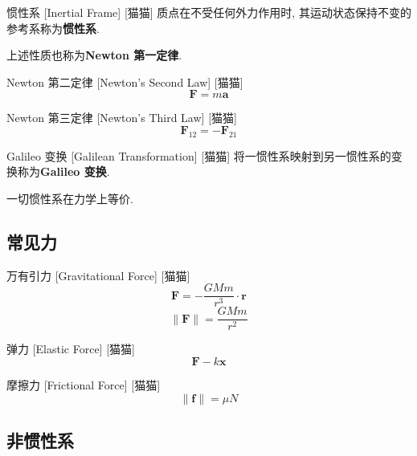 \documentclass[UTF8]{ctexart}
\begin{document}
        \begin{dfn}
            []
            {惯性系}
            [Inertial Frame]
            [猫猫]
            质点在不受任何外力作用时, 其运动状态保持不变的参考系称为\textbf{惯性系}. 

            上述性质也称为\textbf{Newton 第一定律}. 
        \end{dfn}
        
        \begin{axm}
            []
            {Newton 第二定律}
            [Newton's Second Law]
            [猫猫]
            \[\bm{F}=m\bm{a}\]
        \end{axm}
        
        \begin{axm}
            []
            {Newton 第三定律}
            [Newton's Third Law]
            [猫猫]
            \[\bm{F}_{12}=-\bm{F}_{21}\]
        \end{axm}
        
        \begin{axm}
            []
            {Galileo 变换}
            [Galilean Transformation]
            [猫猫]
            将一惯性系映射到另一惯性系的变换称为\textbf{Galileo 变换}. 

            一切惯性系在力学上等价. 
        \end{axm}

    \subsection{常见力}
        
        \begin{axm}
            []
            {万有引力}
            [Gravitational Force]
            [猫猫]
            \[\bm{F}=-\frac{GMm}{r^3}\cdot\bm{r}\]
            \[\|\bm{F}\|=\frac{GMm}{r^2}\]
        \end{axm}
        
        \begin{axm}
            []
            {弹力}
            [Elastic Force]
            [猫猫]
            \[\bm{F}-k\bm{x}\]
        \end{axm}
        
        \begin{axm}
            []
            {摩擦力}
            [Frictional Force]
            [猫猫]
            \[\|\bm{f}\|=\mu N\]
        \end{axm}

    \subsection{非惯性系}
\end{document}
